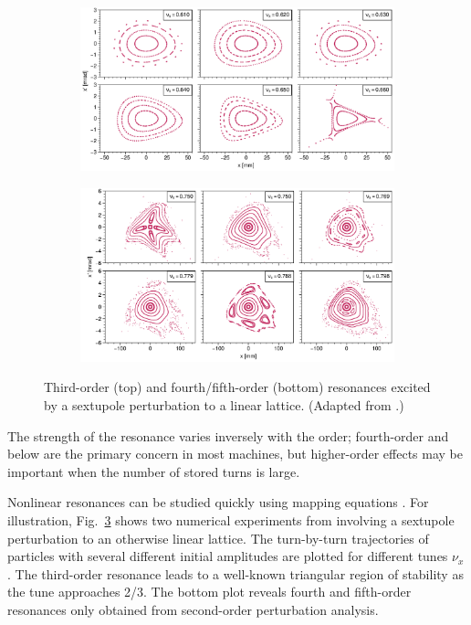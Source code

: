 \begin{figure}[!p]
    \begin{subfigure}[b]{1.0\textwidth}
        \includegraphics[width=\textwidth]{Images/chapter1/sextupole.png}
        \label{fig:sextupole_a}
    \end{subfigure}
    \vfill
    \vspace*{1.0cm}
    \vfill
    \begin{subfigure}[b]{\textwidth}
        \centering
        \includegraphics[width=\textwidth]{Images/chapter1/sextupole_second_order.png}
        \label{fig:sextupole_b}
    \end{subfigure}
    \caption{Third-order (top) and fourth/fifth-order (bottom) resonances excited by a sextupole perturbation to a linear lattice. (Adapted from \cite{Lee2011}.)}
    \label{fig:sextupole}
\end{figure}
%
The strength of the resonance varies inversely with the order; fourth-order and below are the primary concern in most machines, but higher-order effects may be important when the number of stored turns is large. 

Nonlinear resonances can be studied quickly using mapping equations \cite{Reichl1992}. For illustration, Fig.~\ref{fig:sextupole} shows two numerical experiments from \cite{Lee2011} involving a sextupole perturbation to an otherwise linear lattice. The turn-by-turn trajectories of particles with several different initial amplitudes are plotted for different tunes $\nu_x$. The third-order resonance leads to a well-known triangular region of stability as the tune approaches 2/3. The bottom plot reveals fourth and fifth-order resonances only obtained from second-order perturbation analysis.


